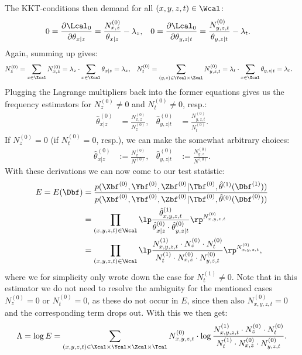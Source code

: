 The KKT-conditions then demand for all $(x,y,z,t) \in \Wcal$:
\begin{align*}
    0= \frac{\partial \Lcal_0}{\partial\theta_{x|z}} &= \frac{N_{x,z}^{(0)}}{\theta_{x|z}}  - \lambda_z, &
    0= \frac{\partial \Lcal_0}{\partial\theta_{y,z|t}} &= \frac{N_{y,z,t}^{(0)}}{\theta_{y,z|t}}  - \lambda_t.
\end{align*}
Again, summing up gives:
\begin{align*}
    N_z^{(0)} &= \sum_{x \in \Xcal} N_{x,z}^{(0)} = \lambda_z \cdot \sum_{x \in \Xcal} \theta_{x|z} = \lambda_z, &
    N_t^{(0)} &= \sum_{(y,z) \in\Ycal\times\Zcal} N_{y,z,t}^{(0)} = \lambda_t \cdot \sum_{x \in \Xcal} \theta_{y,z|t} = \lambda_t.
\end{align*}
Plugging the Lagrange multipliers back into the former equations gives us the frequency estimators
for $N_z^{(0)} \neq 0$ and $N_t^{(0)} \neq 0$, resp.:
\begin{align*}
    \hat \theta_{x|z}^{(0)} & = \frac{N_{x,z}^{(0)}}{N_z^{(0)}}, & \hat \theta_{y,z|t}^{(0)} & = \frac{N_{y,z,t}^{(0)}}{N_t^{(0)}}.
\end{align*}
If $N_z^{(0)} =0$ (if $N_t^{(0)} =0$, resp.), we can make the somewhat arbitrary choices:
\begin{align*}
    \hat \theta_{x|z}^{(0)} & := \frac{N_{x}^{(0)}}{N^{(0)}}, & \hat \theta_{y,z|t}^{(0)} & := \frac{N_{y,z}^{(0)}}{N^{(0)}}.
\end{align*}
With these derivations we can now come to our test statistic:
\begin{align*}
    E = E(\Dbf) 
      &= \frac{ p(\Xbf^{(0)},\Ybf^{(0)},\Zbf^{(0)}|\Tbf^{(0)},\hat\theta^{(1)}(\Dbf^{(1)})) }{p(\Xbf^{(0)},\Ybf^{(0)},\Zbf^{(0)}|\Tbf^{(0)},\hat\theta^{(0)}(\Dbf^{(0)}))}\\
   &= \prod_{(x,y,z,t) \in \Wcal} \lp  \frac{\hat\theta^{(1)}_{x,y,z,t} }{ \hat\theta^{(0)}_{x|z} \cdot \hat\theta^{(0)}_{y,z|t}} \rp^{N^{(0)}_{x,y,z,t}} \\
   &= \prod_{(x,y,z,t) \in \Wcal} \lp \frac{N_{x,y,z,t}^{(1)} \cdot N_z^{(0)} \cdot N_t^{(0)}}{N_{t}^{(1)} \cdot N_{x,z}^{(0)} \cdot N_{y,z,t}^{(0)} } \rp^{N^{(0)}_{x,y,z,t}},
\end{align*}
where we for simplicity only wrote down the case for $N_{t}^{(1)} \neq 0$. Note that in this estimator we do not need to resolve the ambiguity 
for the mentioned cases $N_z^{(0)} =0$ or $N_t^{(0)} =0$, as these do not occur in $E$, since then also $N^{(0)}_{x,y,z,t}=0$ and the corresponding term drops out.
With this we then get:
\begin{align*}
    \Lambda = \log E = \sum_{(x,y,z,t) \in \Xcal\times\Ycal\times\Zcal\times\Tcal}  N^{(0)}_{x,y,z,t} \cdot  \log \frac{N_{x,y,z,t}^{(1)} \cdot N_z^{(0)} \cdot N_t^{(0)}}{N_{t}^{(1)} \cdot N_{x,z}^{(0)} \cdot N_{y,z,t}^{(0)}}.
\end{align*}
